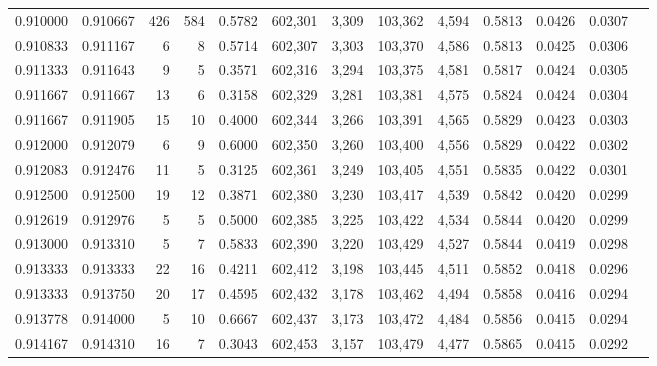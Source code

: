 \begin{tabular}{rrrrrrrrrrrrr}
0.910000 & 0.910667 &   426 & 584 &                                     0.5782 & 602,301 &   3,309 & 103,362 &   4,594 & 0.5813 & 0.0426 & 0.0307 \\
0.910833 & 0.911167 &     6 &   8 &                                     0.5714 & 602,307 &   3,303 & 103,370 &   4,586 & 0.5813 & 0.0425 & 0.0306 \\
0.911333 & 0.911643 &     9 &   5 &                                     0.3571 & 602,316 &   3,294 & 103,375 &   4,581 & 0.5817 & 0.0424 & 0.0305 \\
0.911667 & 0.911667 &    13 &   6 &                                     0.3158 & 602,329 &   3,281 & 103,381 &   4,575 & 0.5824 & 0.0424 & 0.0304 \\
0.911667 & 0.911905 &    15 &  10 &                                     0.4000 & 602,344 &   3,266 & 103,391 &   4,565 & 0.5829 & 0.0423 & 0.0303 \\
0.912000 & 0.912079 &     6 &   9 &                                     0.6000 & 602,350 &   3,260 & 103,400 &   4,556 & 0.5829 & 0.0422 & 0.0302 \\
0.912083 & 0.912476 &    11 &   5 &                                     0.3125 & 602,361 &   3,249 & 103,405 &   4,551 & 0.5835 & 0.0422 & 0.0301 \\
0.912500 & 0.912500 &    19 &  12 &                                     0.3871 & 602,380 &   3,230 & 103,417 &   4,539 & 0.5842 & 0.0420 & 0.0299 \\
0.912619 & 0.912976 &     5 &   5 &                                     0.5000 & 602,385 &   3,225 & 103,422 &   4,534 & 0.5844 & 0.0420 & 0.0299 \\
0.913000 & 0.913310 &     5 &   7 &                                     0.5833 & 602,390 &   3,220 & 103,429 &   4,527 & 0.5844 & 0.0419 & 0.0298 \\
0.913333 & 0.913333 &    22 &  16 &                                     0.4211 & 602,412 &   3,198 & 103,445 &   4,511 & 0.5852 & 0.0418 & 0.0296 \\
0.913333 & 0.913750 &    20 &  17 &                                     0.4595 & 602,432 &   3,178 & 103,462 &   4,494 & 0.5858 & 0.0416 & 0.0294 \\
0.913778 & 0.914000 &     5 &  10 &                                     0.6667 & 602,437 &   3,173 & 103,472 &   4,484 & 0.5856 & 0.0415 & 0.0294 \\
0.914167 & 0.914310 &    16 &   7 &                                     0.3043 & 602,453 &   3,157 & 103,479 &   4,477 & 0.5865 & 0.0415 & 0.0292 \\

\end{tabular}
